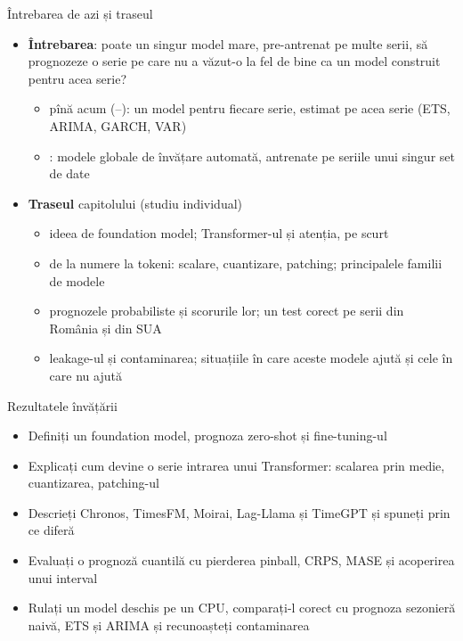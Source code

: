 \begin{frame}{Întrebarea de azi și traseul}
\itemsize{\small}
\begin{itemize}
    \item \textbf{Întrebarea}: poate un singur model mare, pre-antrenat pe multe serii, să prognozeze o serie pe care nu a văzut-o la fel de bine ca un model construit pentru acea serie?
    \begin{itemize}
        \item pînă acum (--): un model pentru fiecare serie, estimat pe acea serie (ETS, ARIMA, GARCH, VAR)
        \item {}: modele globale de învățare automată, antrenate pe seriile unui singur set de date
    \end{itemize}
    \item \textbf{Traseul} capitolului (studiu individual)
    \begin{itemize}
        \item ideea de foundation model; Transformer-ul și atenția, pe scurt
        \item de la numere la tokeni: scalare, cuantizare, patching; principalele familii de modele
        \item prognozele probabiliste și scorurile lor; un test corect pe serii din România și din SUA
        \item leakage-ul și contaminarea; situațiile în care aceste modele ajută și cele în care nu ajută
    \end{itemize}
\end{itemize}
\end{frame}

\begin{frame}{Rezultatele învățării}
\itemsize{\small}
\begin{itemize}
    \item Definiți un foundation model, prognoza zero-shot și fine-tuning-ul
    \item Explicați cum devine o serie intrarea unui Transformer: scalarea prin medie, cuantizarea, patching-ul
    \item Descrieți Chronos, TimesFM, Moirai, Lag-Llama și TimeGPT și spuneți prin ce diferă
    \item Evaluați o prognoză cuantilă cu pierderea pinball, CRPS, MASE și acoperirea unui interval
    \item Rulați un model deschis pe un CPU, comparați-l corect cu prognoza sezonieră naivă, ETS și ARIMA și recunoașteți contaminarea
\end{itemize}
\end{frame}

